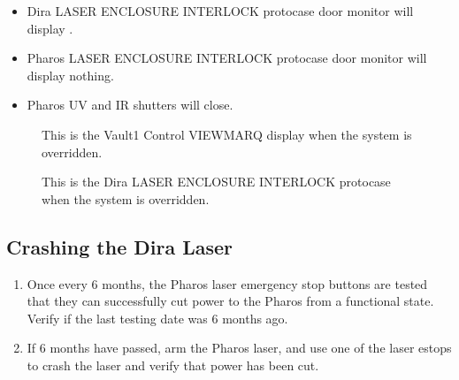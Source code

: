 \documentclass[letterpaper,10pt,english]{sphinxmanual}
\begin{document}
\begin{enumerate}
\begin{itemize}
\item {} 
\sphinxAtStartPar
Dira LASER ENCLOSURE INTERLOCK protocase door monitor will display .

\item {} 
\sphinxAtStartPar
Pharos LASER ENCLOSURE INTERLOCK protocase door monitor will display nothing.

\item {} 
\sphinxAtStartPar
Pharos UV and IR shutters will close.

\end{itemize}

\end{enumerate}

\begin{figure}[htbp]
\centering
\capstart

\noindent{}
\caption{ This is the Vault\sphinxhyphen{}1 Control VIEWMARQ display when the system is overridden.}\label{\detokenize{testing_documentation/Vault-1_laser:id14}}\end{figure}

\begin{figure}[htbp]
\centering
\capstart

\noindent{}
\caption{ This is the Dira LASER ENCLOSURE INTERLOCK protocase when the system is overridden.}\label{\detokenize{testing_documentation/Vault-1_laser:id15}}\end{figure}


\subsection{Crashing the Dira Laser}
\label{\detokenize{testing_documentation/Vault-1_laser:crashing-the-dira-laser}}\begin{enumerate}
%
\item {} 
\sphinxAtStartPar
Once every 6 months, the Pharos laser emergency stop buttons are tested that they can successfully cut power to the Pharos from a functional state.
Verify if the last testing date was 6 months ago.

\item {} 
\sphinxAtStartPar
If 6 months have passed, arm the Pharos laser, and use one of the laser e\sphinxhyphen{}stops to crash the laser and verify that power has been cut.

\end{enumerate}
\end{document}
